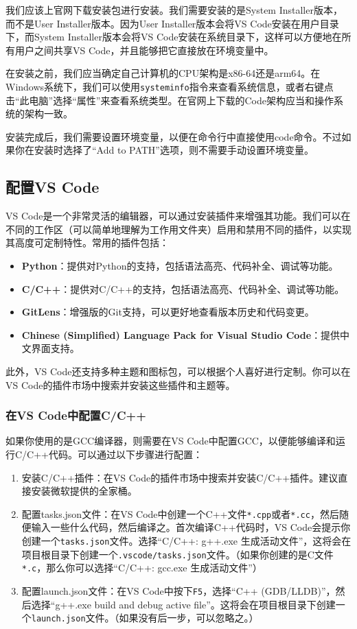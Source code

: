 我们应该上官网下载安装包进行安装。我们需要安装的是System Installer版本，而不是User Installer版本。因为User Installer版本会将VS Code安装在用户目录下，而System Installer版本会将VS Code安装在系统目录下，这样可以方便地在所有用户之间共享VS Code，并且能够把它直接放在环境变量中。

在安装之前，我们应当确定自己计算机的CPU架构是x86-64还是arm64。在Windows系统下，我们可以使用\texttt{systeminfo}指令来查看系统信息，或者右键点击“此电脑”选择“属性”来查看系统类型。在官网上下载的Code架构应当和操作系统的架构一致。

安装完成后，我们需要设置环境变量，以便在命令行中直接使用code命令。不过如果你在安装时选择了“Add to PATH”选项，则不需要手动设置环境变量。

\subsection{配置VS Code}

VS Code是一个非常灵活的编辑器，可以通过安装插件来增强其功能。我们可以在不同的工作区（可以简单地理解为工作用文件夹）启用和禁用不同的插件，以实现其高度可定制特性。常用的插件包括：

\begin{itemize}
  \item \textbf{Python}：提供对Python的支持，包括语法高亮、代码补全、调试等功能。
  \item \textbf{C/C++}：提供对C/C++的支持，包括语法高亮、代码补全、调试等功能。
  \item \textbf{GitLens}：增强版的Git支持，可以更好地查看版本历史和代码变更。
  \item \textbf{Chinese (Simplified) Language Pack for Visual Studio Code}：提供中文界面支持。
\end{itemize}

此外，VS Code还支持多种主题和图标包，可以根据个人喜好进行定制。你可以在VS Code的插件市场中搜索并安装这些插件和主题等。

\subsubsection{在VS Code中配置C/C++}\label{sec:configure-cpp}

如果你使用的是GCC编译器，则需要在VS Code中配置GCC，以便能够编译和运行C/C++代码。可以通过以下步骤进行配置：

\begin{enumerate}
  \item 安装C/C++插件：在VS Code的插件市场中搜索并安装C/C++插件。建议直接安装微软提供的全家桶。
  \item 配置tasks.json文件：在VS Code中创建一个C++文件\texttt{*.cpp}或者\texttt{*.cc}，然后随便输入一些什么代码，然后编译之。首次编译C++代码时，VS Code会提示你创建一个\texttt{tasks.json}文件。选择“C/C++: g++.exe 生成活动文件”，这将会在项目根目录下创建一个\texttt{.vscode/tasks.json}文件。（如果你创建的是C文件\texttt{*.c}，那么你可以选择“C/C++: gcc.exe 生成活动文件”）
  \item 配置launch.json文件：在VS Code中按下\texttt{F5}，选择“C++ (GDB/LLDB)”，然后选择“g++.exe build and debug active file”。这将会在项目根目录下创建一个\texttt{launch.json}文件。（如果没有后一步，可以忽略之。）
\end{enumerate}

